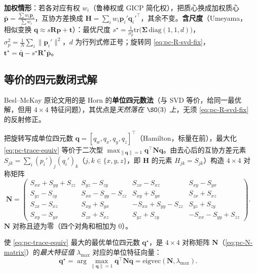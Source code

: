 \begin{note}
\textbf{加权情形}：若各对应有权 $w_i$（鲁棒权或 GICP 简化权），把质心换成加权质心 $\bar{\mathbf{p}}=\frac{\sum w_i\mathbf{p}_i}{\sum w_i}$，互协方差换成 $\mathbf{H}=\sum_i w_i\mathbf{p}_i'\mathbf{q}_i'^\top$，其余不变。\textbf{含尺度}（Umeyama，相似变换 $\mathbf{q}\approx s\mathbf{R}\mathbf{p}+\mathbf{t}$）：最优尺度 $s^\star=\frac{1}{\sigma_p^2}\mathrm{tr}\!\big(\boldsymbol{\Sigma}\,\mathrm{diag}(1,1,d)\big)$，$\sigma_p^2=\frac{1}{N}\sum_i\|\mathbf{p}_i'\|^2$，$d$ 为行列式修正号；旋转同 \cref{eq:pc-R-svd-fix}，$\mathbf{t}^\star=\bar{\mathbf{q}}-s^\star\mathbf{R}^\star\bar{\mathbf{p}}$。
\end{note}

\subsection{等价的四元数闭式解}
\label{sec:pc-icp-quat}

Besl--McKay 原论文用的是 Horn 的\textbf{单位四元数法}（与 SVD 等价，给同一最优解，但用 $4\times4$ 特征问题），其优点是\emph{天然落在 $\SO(3)$ 上}，无须 \cref{eq:pc-R-svd-fix} 的反射修正\cite{horn1987absolute,besl1992icp}。

\begin{derivation}
把旋转写成单位四元数 $\mathbf{q}=[q_w,q_x,q_y,q_z]^\top$（Hamilton，标量在前），最大化 \cref{eq:pc-trace-equiv} 等价于二次型 $\max_{\|\mathbf{q}\|=1}\mathbf{q}^\top\mathbf{N}\mathbf{q}$。由去心后的互协方差元素 $S_{jk}=\sum_i(p_i')_j(q_i')_k$（$j,k\in\{x,y,z\}$，即 $\mathbf{H}$ 的元素 $H_{jk}=S_{jk}$）构造 $4\times4$ 对称矩阵
\begin{equation}
  \mathbf{N}=\begin{pmatrix}
  S_{xx}+S_{yy}+S_{zz} & S_{yz}-S_{zy} & S_{zx}-S_{xz} & S_{xy}-S_{yx}\\
  S_{yz}-S_{zy} & S_{xx}-S_{yy}-S_{zz} & S_{xy}+S_{yx} & S_{zx}+S_{xz}\\
  S_{zx}-S_{xz} & S_{xy}+S_{yx} & -S_{xx}+S_{yy}-S_{zz} & S_{yz}+S_{zy}\\
  S_{xy}-S_{yx} & S_{zx}+S_{xz} & S_{yz}+S_{zy} & -S_{xx}-S_{yy}+S_{zz}
  \end{pmatrix}.
  \label{eq:pc-N-matrix}
\end{equation}
$\mathbf{N}$ 对称且迹为零（四个对角和相加为 $0$）。
\end{derivation}

\begin{theorem}\label{thm:pc-horn}
使 \cref{eq:pc-trace-equiv} 最大的最优单位四元数 $\mathbf{q}^\star$，是 $4\times4$ 对称矩阵 $\mathbf{N}$（\cref{eq:pc-N-matrix}）的\emph{最大特征值} $\lambda_{\max}$ 对应的单位特征向量：
\begin{equation}
  \mathbf{q}^\star=\arg\max_{\|\mathbf{q}\|=1}\mathbf{q}^\top\mathbf{N}\mathbf{q}=\mathrm{eigvec}(\mathbf{N},\lambda_{\max}).
  \label{eq:pc-q-star}
\end{equation}
\end{theorem}

